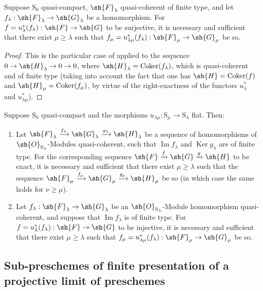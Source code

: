 \begin{corollary}[8.5.7]
\label{IV.8.5.7}
Suppose $\mathrm{S}_0$ quasi-compact, $\sh{F}_\lambda$ quasi-coherent of finite type, and let $f_\lambda:\sh{F}_\lambda\to\sh{G}_\lambda$ be a homomorphism.
For $f=u_\lambda^*(f_\lambda):\sh{F}\to\sh{G}$ to be surjective, it is necessary and sufficient that there exist $\mu\geqslant\lambda$ such that $f_\mu=u_{\lambda\mu}^*(f_\lambda):\sh{F}_\mu\to\sh{G}_\mu$ be so.
\end{corollary}

\begin{proof}
This is the particular case of  applied to the sequence $0\to\sh{H}_\lambda\to 0\to 0$, where $\sh{H}_\lambda=\operatorname{Coker}(f_\lambda)$, which is quasi-coherent and of finite type (taking into account the fact that one has $\sh{H}=\operatorname{Coker}(f)$ and $\sh{H}_\mu=\operatorname{Coker}(f_\mu)$, by virtue of the right-exactness of the functors $u_\lambda^*$ and $u_{\lambda\mu}^*$).
\end{proof}

\begin{corollary}[8.5.8]
\label{IV.8.5.8}
Suppose $\mathrm{S}_0$ quasi-compact and the morphisms $u_{\lambda\mu}:\mathrm{S}_\mu\to\mathrm{S}_\lambda$ flat.
Then:
\begin{enumerate}[label=(\roman*)]
  \item Let $\sh{F}_\lambda\xrightarrow{f_\lambda}\sh{G}_\lambda\xrightarrow{g_\lambda}\sh{H}_\lambda$ be a sequence of homomorphisms of $\sh{O}_{\mathrm{S}_\lambda}$-Modules quasi-coherent, such that $\operatorname{Im} f_\lambda$ and $\operatorname{Ker} g_\lambda$ are of finite type.
For the corresponding sequence $\sh{F}\xrightarrow{f}\sh{G}\xrightarrow{g}\sh{H}$ to be
exact, it is necessary and sufficient that there exist $\mu\geqslant\lambda$ such that the sequence $\sh{F}_\mu\xrightarrow{f_\mu}\sh{G}_\mu\xrightarrow{g_\mu}\sh{H}_\mu$ be so (in which case the same holds for $\nu\geqslant\mu$).
  \item Let $f_\lambda:\sh{F}_\lambda\to\sh{G}_\lambda$ be an $\sh{O}_{\mathrm{S}_\lambda}$-Module homomorphism quasi-coherent, and suppose that $\operatorname{Im} f_\lambda$ is of finite type.
For $f=u_\lambda^*(f_\lambda):\sh{F}\to\sh{G}$ to be injective, it is necessary and sufficient that there exist $\mu\geqslant\lambda$ such that $f_\mu=u_{\lambda\mu}^*(f_\lambda):\sh{F}_\mu\to\sh{G}_\mu$ be so.
\end{enumerate}
\end{corollary}\subsection{Sub-preschemes of finite presentation of a projective limit of preschemes}
\label{subsection:IV.8.6}

